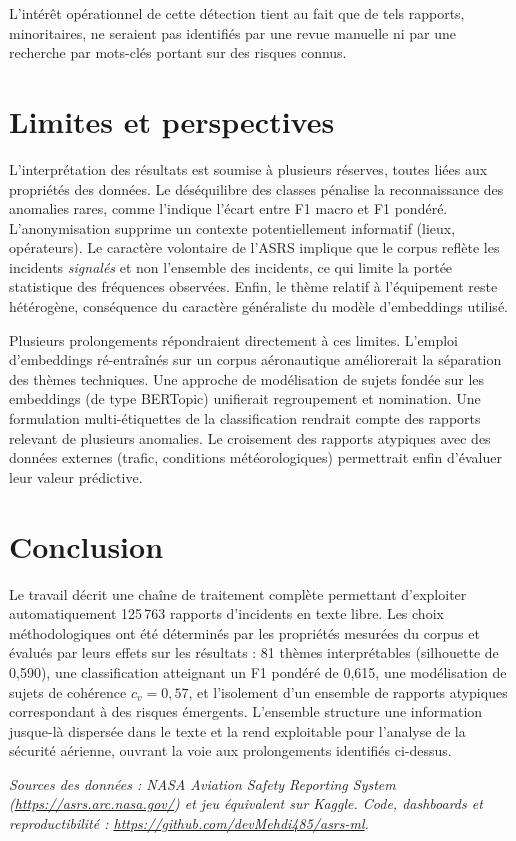 \documentclass[11pt,a4paper]{article}
\begin{document}
\noindent L'intérêt opérationnel de cette détection tient au fait que de tels rapports,
minoritaires, ne seraient pas identifiés par une revue manuelle ni par une recherche par
mots-clés portant sur des risques connus.

\section{Limites et perspectives}

L'interprétation des résultats est soumise à plusieurs réserves, toutes liées aux propriétés
des données. Le déséquilibre des classes pénalise la reconnaissance des anomalies rares, comme
l'indique l'écart entre F1 macro et F1 pondéré. L'anonymisation supprime un contexte
potentiellement informatif (lieux, opérateurs). Le caractère volontaire de l'ASRS implique
que le corpus reflète les incidents \emph{signalés} et non l'ensemble des incidents, ce qui
limite la portée statistique des fréquences observées. Enfin, le thème relatif à l'équipement
reste hétérogène, conséquence du caractère généraliste du modèle d'embeddings utilisé.

Plusieurs prolongements répondraient directement à ces limites. L'emploi d'embeddings
ré-entraînés sur un corpus aéronautique améliorerait la séparation des thèmes techniques. Une
approche de modélisation de sujets fondée sur les embeddings (de type BERTopic) unifierait
regroupement et nomination. Une formulation multi-étiquettes de la classification rendrait
compte des rapports relevant de plusieurs anomalies. Le croisement des rapports atypiques avec
des données externes (trafic, conditions météorologiques) permettrait enfin d'évaluer leur
valeur prédictive.

\section{Conclusion}

Le travail décrit une chaîne de traitement complète permettant d'exploiter
automatiquement 125\,763 rapports d'incidents en texte libre. Les choix méthodologiques ont
été déterminés par les propriétés mesurées du corpus et évalués par leurs effets sur les
résultats : 81 thèmes interprétables (silhouette de 0,590), une classification atteignant un
F1 pondéré de 0,615, une modélisation de sujets de cohérence $c_v = 0{,}57$, et l'isolement
d'un ensemble de rapports atypiques correspondant à des risques émergents. L'ensemble structure
une information jusque-là dispersée dans le texte et la rend exploitable pour l'analyse de la
sécurité aérienne, ouvrant la voie aux prolongements identifiés ci-dessus.

\vfill
\noindent\footnotesize\textit{Sources des données : NASA Aviation Safety Reporting System
(\url{https://asrs.arc.nasa.gov/}) et jeu équivalent sur Kaggle. Code, dashboards et
reproductibilité : \url{https://github.com/devMehdi485/asrs-ml}.}
\end{document}
